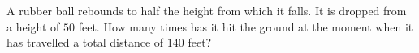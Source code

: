 A rubber ball rebounds to half the height from which it falls. It is dropped from a height of $50$ feet. How many times has it hit the ground at the moment when it has travelled a total distance of $140$ feet?
